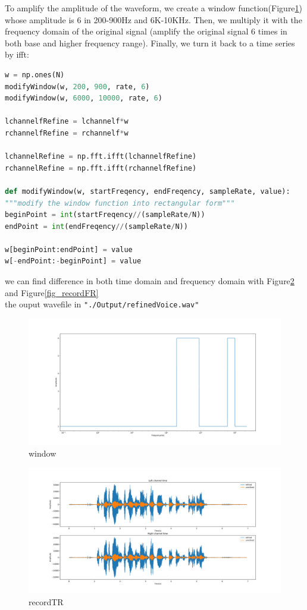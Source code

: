 \documentclass[a4paper,12pt]{article}
\begin{document}
To amplify the amplitude of the waveform,  we create a window function(Figure\ref{fig_window}) whose amplitude is 6 in 200-900Hz and 6K-10KHz. Then, we multiply it with the frequency domain of the original signal (amplify the original signal 6 times in both base and higher frequency range). Finally, we turn it back to a time series by ifft:
\begin{lstlisting}[language=Python]
w = np.ones(N)
modifyWindow(w, 200, 900, rate, 6)
modifyWindow(w, 6000, 10000, rate, 6)

lchannelfRefine = lchannelf*w
rchannelfRefine = rchannelf*w

lchannelRefine = np.fft.ifft(lchannelfRefine)
rchannelRefine = np.fft.ifft(rchannelfRefine)

def modifyWindow(w, startFreqency, endFreqency, sampleRate, value):
"""modify the window function into rectangular form"""
beginPoint = int(startFreqency//(sampleRate/N))
endPoint = int(endFreqency//(sampleRate/N))

w[beginPoint:endPoint] = value
w[-endPoint:-beginPoint] = value
\end{lstlisting}
we can find difference in both time domain and frequency domain with Figure\ref{fig_recordTR} and Figure\ref{fig_recordFR}\\
 the ouput wavefile in \lstinline{"./Output/refinedVoice.wav"}
\begin{figure}[h]   
	\centering 
	\includegraphics[width=12cm]{../Output/Figures/window.pdf} 
	\caption{window}   
	\label{fig_window}
\end{figure}

\begin{figure}[h]   
	\centering 
	\includegraphics[width=12cm]{../Output/Figures/recordTR.pdf} 
	\caption{recordTR}   
	\label{fig_recordTR}
\end{figure}
\end{document}
